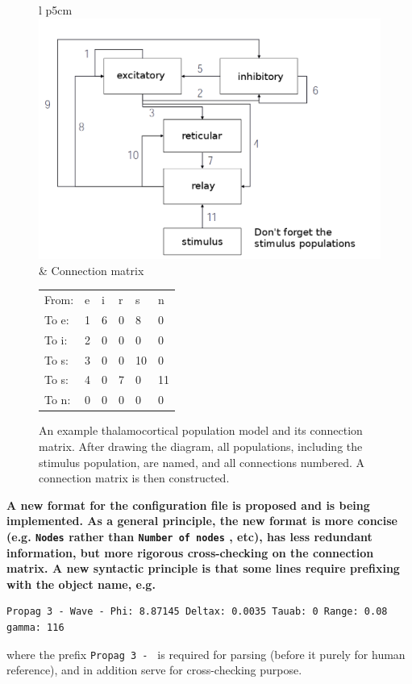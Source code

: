 \documentclass[12pt,a4paper]{article}
\newcommand{\type}[1]{ {\small\small\tt #1} }
\begin{document}
\begin{figure}\begin{tabular}{l p{5cm}}
\includegraphics[scale=0.3]{pop.png}&
Connection matrix

\begin{tabular}{ l l l l l l }
	From: & e&i&r&s&n\\
	To e: & 1&6&0&8&0\\
	To i: & 2&0&0&0&0\\
	To s: & 3&0&0&10&0\\
	To s: & 4&0&7&0&11\\
	To n: & 0&0&0&0&0
\end{tabular}
\end{tabular}

\caption{An example thalamocortical population model and its connection matrix. After drawing the diagram, all populations, including the stimulus population, are named, and all connections numbered. A connection matrix is then constructed.}\label{fig:pop}

\end{figure}

{\bf A new format for the configuration file is proposed and is being implemented. As a general principle, the new format is more concise (e.g. \type{Nodes} rather than \type{Number of nodes}, etc), has less redundant information, but more rigorous cross-checking on the connection matrix. A new syntactic principle is that some lines require prefixing with the object name, e.g.
\begin{lstlisting}
Propag 3 - Wave - Phi: 8.87145 Deltax: 0.0035 Tauab: 0 Range: 0.08 gamma: 116
\end{lstlisting}
where the prefix \type{Propag 3 - } is required for parsing (before it purely for human reference), and in addition serve for cross-checking purpose.}
\end{document}
